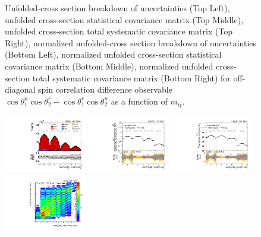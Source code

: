 \begin{figure}[htb]
\begin{center}
\caption{Unfolded-cross section breakdown of uncertainties (Top Left), unfolded cross-section statistical covariance matrix (Top Middle), unfolded cross-section total systematic covariance matrix (Top Right), normalized unfolded-cross section breakdown of uncertainties (Bottom Left), normalized unfolded cross-section statistical covariance matrix (Bottom Middle), normalized unfolded cross-section total systematic covariance matrix (Bottom Right) for off-diagonal spin correlation difference observable $\cos\theta_{1}^{n}\cos\theta_{2}^{r}-\cos\theta_{1}^{r}\cos\theta_{2}^{n}$ as a function of $m_{t\bar{t}}$.}
\label{fig:c_Mnr_mttbar_uncertainties}
\end{center}
\end{figure}
\clearpage
\begin{figure}[htb]
\begin{center}
 \includegraphics[width=0.32\textwidth]{fig_fullRun2UL/controlplots/combined/Hyp_LLBarCPnk_vs_TTBarMass.pdf}
 \includegraphics[width=0.32\textwidth]{fig_fullRun2UL/unfolding/combined/UnfoldedResults_c_Pnk_mttbar.pdf}
 \includegraphics[width=0.32\textwidth]{fig_fullRun2UL/unfolding/combined/UnfoldedResultsNorm_c_Pnk_mttbar.pdf} \\
 \includegraphics[width=0.32\textwidth]{fig_fullRun2UL/unfolding/combined/ResponseMatrix_c_Pnk_mttbar.pdf}

\end{center}
\end{figure}
